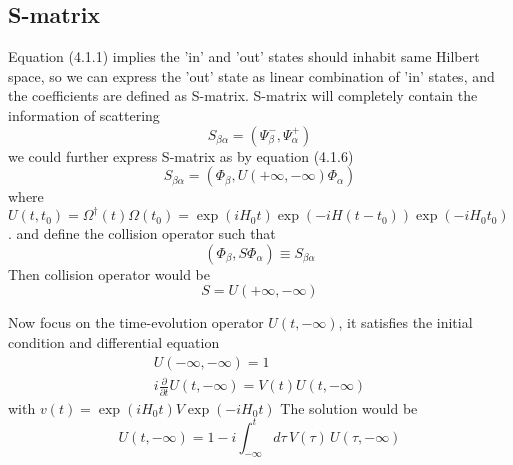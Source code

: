 \documentclass[12pt]{article}
\numberwithin{equation}{subsection}
\begin{document}
\subsection{S-matrix}
Equation (4.1.1) implies the 'in' and 'out' states should inhabit same Hilbert space, so we can express the 'out' state as linear combination of 'in' states, and the coefficients are defined as S-matrix.
S-matrix will completely contain the information of scattering
\begin{equation}
    S_{\beta\alpha} = \left(\Psi_{\beta}^{-}, \Psi_{\alpha}^{+}\right)
\end{equation}
we could further express S-matrix as by equation (4.1.6)
\begin{equation}
    S_{\beta\alpha} = \left(\Phi_{\beta}, U(+\infty, -\infty)\Phi_{\alpha}\right)
\end{equation}
where $U(t, t_0) = \Omega^{\dagger}(t)\Omega(t_0) = \exp(iH_0t)\exp(-iH(t-t_0))\exp(-iH_0t_0)$.
and define the collision operator such that 
\begin{equation}
    \left(\Phi_{\beta}, S\Phi_{\alpha}\right) \equiv S_{\beta\alpha}
\end{equation}
Then collision operator would be
\begin{equation}
    S=U(+\infty, -\infty)
\end{equation}

Now focus on the time-evolution operator $U(t, -\infty)$, it satisfies the initial condition and differential equation
\begin{equation}
    \begin{split}
        U(-\infty, -\infty) = 1\\
        i\frac{\partial}{\partial t}U(t, -\infty) =V(t)U(t, -\infty)
    \end{split}
\end{equation}
with $v(t) = \exp(iH_0t)V\exp(-iH_0t)$
The solution would be
\begin{equation}
    U(t, -\infty) = 1 - i\int_{-\infty}^{t}{d\tau\, V(\tau)\,U(\tau, -\infty)}
\end{equation}



\end{document}

